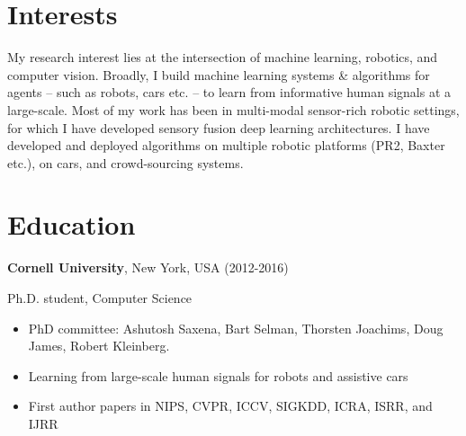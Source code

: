 \documentclass[line,margin]{res}
\begin{document}
 

\address{142 Gates Building, Stanford University, CA 94305}
\address{ashesh@cs.cornell.edu, \url{www.cs.cornell.edu/~ashesh}}



\begin{resume} 
 

\section{Interests}
My research interest lies at the intersection of machine learning, robotics, and computer vision. Broadly, I build machine learning systems \& algorithms for agents -- such as robots, cars etc. -- to learn from informative human signals at a large-scale. Most of my work has been in multi-modal sensor-rich robotic settings, for which I have developed sensory fusion deep learning architectures. I have developed and deployed algorithms on multiple robotic platforms (PR2, Baxter etc.), on cars, and crowd-sourcing systems.

 
\iffalse

for humans to help machines -- such as robots, cars etc. -- become smart by implicitly providing
learning signals. I am particularly interested in learning from signals that are easy to
elicit at large-scale but are inherently weak and noisy. I am recently
exploiting the potential of crowd-sourcing feedback to teach robots good trajectories in
context-rich environments and using vision based human feedback for
assistive cars. 
\fi
\section{Education} 
 
{\bf Cornell University}, New York, USA  \hfill (2012-2016)
 
 \vspace{-4mm}
  \hspace {4mm } Ph.D. student, Computer Science 
 \begin{itemize} \itemsep -2pt  %
 \item PhD committee: Ashutosh Saxena, Bart Selman, Thorsten Joachims, Doug James,
Robert Kleinberg.
 \item Learning from large-scale human signals for robots and assistive cars
  \item First author papers in NIPS, CVPR, ICCV, SIGKDD, ICRA, ISRR, and IJRR
 \end{itemize}
 


\end{resume}
\end{document}
